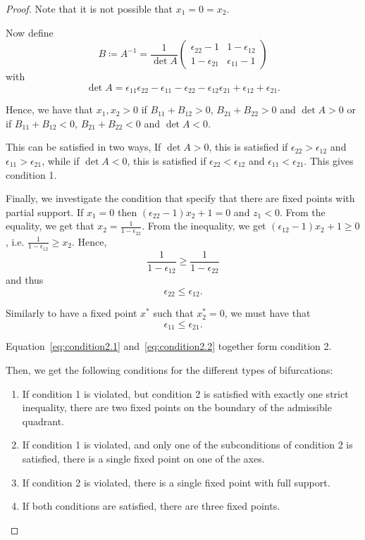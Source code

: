 \documentclass{article} %
\newcounter{ct}
\theoremstyle{definition}
\theoremstyle{remark}
\begin{document}
\begin{proof}
Note that it is not possible that \(x_1=0=x_2\).

Now define
\[
B\coloneqq A^{-1} = \frac{1}{\det A}
\begin{pmatrix}
\epsilon_{22}-1  &  1-\epsilon_{12} \\
1-\epsilon_{21}  &  \epsilon_{11}-1
\end{pmatrix}
\]
with \[\det A = \epsilon_{11}\epsilon_{22}-\epsilon_{11}-\epsilon_{22}-\epsilon_{12}\epsilon_{21}+\epsilon_{12}+\epsilon_{21}.\]

Hence, we have that \(x_1,x_2>0\) if \(B_{11}+B_{12}>0\), \(B_{21}+B_{22}>0\) and \(\det A >0\)
or if \(B_{11}+B_{12}<0\), \(B_{21}+B_{22}<0\) and \(\det A <0\).

This can be satisfied in two ways,
If \(\det A >0\), this is satisfied if \(\epsilon_{22}>\epsilon_{12}\) and \(\epsilon_{11}>\epsilon_{21}\),
while if \(\det A <0\), this is satisfied if \(\epsilon_{22}<\epsilon_{12}\) and \(\epsilon_{11}<\epsilon_{21}\).
This gives condition 1. %



Finally, we investigate the condition that specify that there are fixed points with partial support.
If \(x_1=0\) then \((\epsilon_{22}-1)x_2+1=0\) and \(z_1<0\).
From the equality, we get that \(x_{2}=\frac{1}{1-\epsilon_{22}}\).
From the inequality, we get  \((\epsilon_{12}-1)x_2+1\geq 0\), i.e. \(\frac{1}{1-\epsilon_{12}}\geq x_2\).
Hence,
\begin{equation*}
\frac{1}{1-\epsilon_{12}}\geq\frac{1}{1-\epsilon_{22}}
\end{equation*}
and thus
\begin{equation}\label{eq:condition2.1}
\epsilon_{22} \leq \epsilon_{12}.
\end{equation}

Similarly to have a fixed point \(x^*\) such that \(x_2^*=0\), we must have that
\begin{equation}\label{eq:condition2.2}
\epsilon_{11} \leq \epsilon_{21}.
\end{equation}

Equation~\ref{eq:condition2.1} and~\ref{eq:condition2.2} together form condition 2.


Then, we get the following conditions for the different types of bifurcations:
\begin{enumerate}
\item  If condition 1 is violated, but condition 2 is satisfied with exactly one strict inequality, there are two fixed points on the boundary of the admissible quadrant.
\item If condition 1 is violated, and only one of the subconditions of condition 2 is satisfied, there is a single fixed point on one of the axes.
\item If condition 2 is violated, there is a single fixed point with full support.
\item If both conditions are satisfied, there are three fixed points.
\end{enumerate}



\end{proof}
\end{document}
